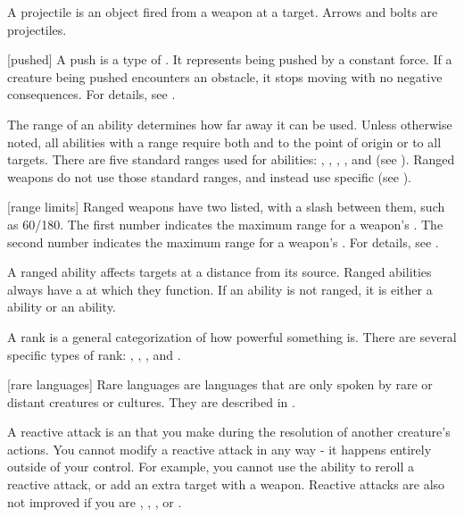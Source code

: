  A projectile is an object fired from a weapon at a target.
Arrows and bolts are projectiles.

[pushed] A push is a type of .
It represents being pushed by a constant force.
If a creature being pushed encounters an obstacle, it stops moving with no negative consequences.
For details, see .

 The range of an ability determines how far away it can be used.
Unless otherwise noted, all abilities with a range require both  and  to the point of origin or to all targets.
There are five standard ranges used for abilities: \shortrange, \medrange, \longrange, \distrange, and \extrange (see ).
Ranged weapons do not use those standard ranges, and instead use specific  (see ).

[range limits] Ranged weapons have two  listed, with a slash between them, such as 60/180.
The first number indicates the maximum range for a weapon's .
The second number indicates the maximum range for a weapon's .
For details, see .

 A ranged ability affects targets at a distance from its source.
Ranged abilities always have a  at which they function.
If an ability is not ranged, it is either a  ability or an  ability.

 A rank is a general categorization of how powerful something is.
There are several specific types of rank: , , , and .

[rare languages] Rare languages are languages that are only spoken by rare or distant creatures or cultures.
They are described in .

 A reactive attack is an  that you make during the resolution of another creature's actions.
You cannot modify a reactive attack in any way - it happens entirely outside of your control.
For example, you cannot use the  ability to reroll a reactive attack, or add an extra target with a  weapon.
Reactive attacks are also not improved if you are \empowered, \focused, \maximized, or \primed.

